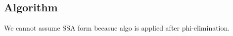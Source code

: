 \documentclass[12pt]{article}
\begin{document}
%

\subsection{Algorithm}

We cannot assume SSA form becasue algo is applied after phi-elimination.

\setlength{\algomargin}{0em}
\end{document}

